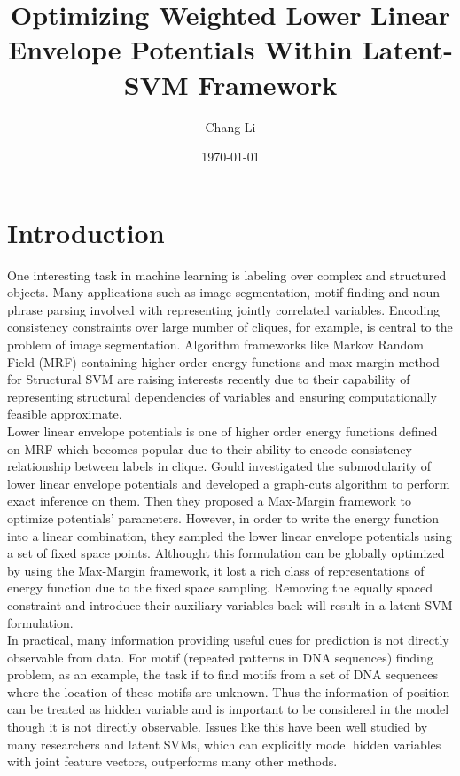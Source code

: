 \documentclass{article}
\title{Optimizing Weighted Lower Linear Envelope Potentials Within Latent-SVM Framework}
\author{Chang Li}
\date{\today}
\begin{document}
	\maketitle
	
	\section{Introduction}
	One interesting task in machine learning is labeling over complex and structured objects. Many applications such as image segmentation, motif finding and noun-phrase parsing involved with representing jointly correlated variables. Encoding consistency constraints over large number of cliques, for example, is central to the problem of image segmentation. Algorithm frameworks like Markov Random Field (MRF) containing higher order energy functions and max margin method for Structural SVM are raising interests recently due to their capability of representing structural dependencies of variables and ensuring computationally feasible approximate. \\
	Lower linear envelope potentials is one of higher order energy functions defined on MRF which becomes popular due to their ability to encode consistency relationship between labels in clique. Gould\cite{gouldlearning} investigated the submodularity of lower linear envelope potentials and developed a graph-cuts algorithm to perform exact inference on them. Then they proposed a Max-Margin framework to optimize potentials' parameters. However, in order to write the energy function into a linear combination, they sampled the lower linear envelope potentials using a set of fixed space points. Althought this formulation can be globally optimized by using the Max-Margin framework, it lost a rich class of representations of energy function due to the fixed space sampling. Removing the equally spaced constraint and introduce their auxiliary variables back will result in a latent SVM formulation.\\
	In practical, many information providing useful cues for prediction is not directly observable from data. For motif (repeated patterns in DNA sequences) finding problem, as an example, the task if to find motifs from a set of DNA sequences where the location of these motifs are unknown. Thus the information of position can be treated as hidden variable and is important to be considered in the model though it is not directly observable. Issues like this have been well studied by many researchers and latent SVMs, which can explicitly model hidden variables with joint feature vectors, outperforms many other methods. \\
\end{document}
